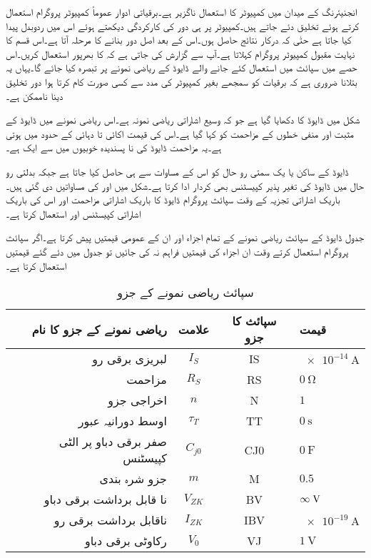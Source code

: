 انجنیئرنگ کے میدان میں کمپیوٹر کا استعمال ناگزیر ہے۔برقیاتی ادوار عموماً کمپیوٹر پروگرام استعمال کرتے ہوئے تخلیق دئے جاتے ہیں۔کمپیوٹر پر ہی دور کی کارکردگی دیکھتے ہوئے اس میں ردوبدل پیدا کیا جاتا ہے حتٰی کہ درکار نتائج حاصل ہوں۔اس کے بعد اصل دور بنانے کا مرحلہ آتا ہے۔اس قسم کا نہایت مقبول کمپیوٹر پروگرام   کہلاتا ہے۔آپ سے گزارش کی جاتی ہے کہ  کا بھرپور  استعمال کریں۔اس حصے میں سپائث میں استعمال کئے جانے والے ڈایوڈ کے ریاضی نمونے پر تبصرہ کیا جائے گا۔یہاں یہ بتلانا ضروری ہے کہ برقیات کو سمجھے بغیر کمپیوٹر کی مدد سے کسی صورت کام کرتا ہوا دور تخلیق دینا ناممکن ہے۔

شکل   میں ڈایوڈ کا  دکھایا گیا ہے جو کہ وسیع اشاراتی ریاضی نمونہ ہے۔اس ریاضی نمونے میں ڈایوڈ کے مثبت اور منفی خطوں کے مزاحمت کو  کہا گیا ہے۔اس کی قیمت اکائی تا دہائی کے حدود میں ہوتی ہے۔یہ مزاحمت ڈایوڈ کی نا پسندیدہ خوبیوں میں سے ایک ہے۔

ڈایوڈ کے ساکن یا یک سمتی رو حال کو اس کے    مساوات سے ہی حاصل کیا جاتا ہے جبکہ بدلتی رو حال میں ڈایوڈ کی تغیر پذیر کپیسٹنس  بھی کردار ادا کرتا ہے۔شکل میں   اور  کی مساواتیں دی گئی ہیں۔باریک اشاراتی تجزیہ  کے وقت سپائث پروگرام ڈایوڈ کا باریک اشاراتی مزاحمت  اور اس کی باریک اشاراتی کپیسٹنس  اور  استعمال کرتا ہے۔

جدول   ڈایوڈ کے سپائث ریاضی نمونے کے تمام اجزاء اور ان کے عمومی قیمتیں پیش کرتا ہے۔اگر سپائث پروگرام استعمال کرتے وقت ان اجزاء کی قیمتیں فراہم نہ کی جائیں تو  جدول  میں دئے گئے قیمتیں استعمال کرتا ہے۔
\begin{table}
\caption{سپائث ریاضی نمونے کے جزو}
\label{جدول_سپائث_ماڈل_کے_جزو}
\centering
\begin{tabular}[htp]{r c c l}
\toprule
ریاضی نمونے کے جزو کا نام & علامت & سپائث کا جزو & قیمت \\
\midrule
لبریزی برقی رو   & $ I_S $    & IS & $\SI{e-14}{\ampere}$\\
مزاحمت & $R_S$  & RS & $\SI{0}{\ohm}$ \\
اخراجی جزو & $n$ & N & $1$ \\
اوسط دورانیہ عبور & $\tau_T$ & TT & $\SI{0}{\second}$\\
صفر برقی دباو پر الٹی کپیسٹنس & $C_{j0}$ & CJ0 & $\SI{0}{\farad}$\\
جزو شرہ بندی & $m$ & M & $0.5$\\
نا قابل برداشت برقی دباو &  $V_{ZK}$ & BV & $\infty \hspace{1mm} \si{\volt}$\\
ناقابل برداشت برقی رو & $I_{ZK}$ & IBV & $\SI{e-19}{\ampere}$\\
رکاوٹی برقی دباو & $V_0$ & VJ & $\SI{1}{\volt}$ \\
\bottomrule
\end{tabular}
\end{table}
%

